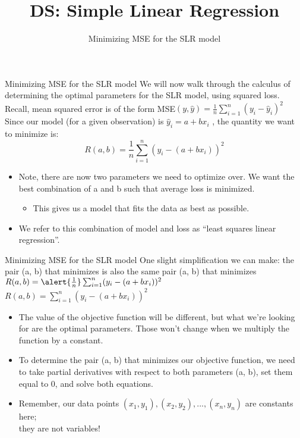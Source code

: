 \documentclass[aspectratio=169]{../latex_main/tntbeamer}  %
\title[Regression]{DS: Simple Linear Regression}
\subtitle{Minimizing MSE for the SLR model}
\begin{document}
	
	\maketitle
	\begin{frame}{Minimizing MSE for the SLR model}
	    We will now walk through the calculus of determining the optimal parameters for the SLR model, using squared loss. Recall, mean squared error is of the form    MSE$(y,\hat{y})= \frac{1}{n}\sum_{i=1}^n(y_i-\hat{y}_i)^2$             
	   Since our model (for a given observation) is  $\hat{y}_i = a +bx_i$                        , the quantity we want to minimize is: 
	   \begin{equation*}
	       R(a,b)= \frac{1}{n}\sum_{i=1}^n(y_i- (a +bx_i))^2
	   \end{equation*}
        \begin{itemize}
            \item Note, there are now two parameters we need to optimize over. We want the best combination of a and b such that average loss is minimized.
            \begin{itemize}
                \item This gives us a model that fits the data as best as possible.
            \end{itemize}
            \item We refer to this combination of model and loss as \alert{``least squares linear regression''}.
    
        \end{itemize}
	\end{frame}
	
	
	\begin{frame}{Minimizing MSE for the SLR model}
	    One slight simplification we can make: the pair (a, b) that minimizes is also the same pair (a, b) that minimizes      $R(a,b)= \alert{\frac{1}{n}}\sum_{i=1}^n(y_i- (a +bx_i))^2$    \\         
	     \hspace{5cm} $ R(a,b)= \sum_{i=1}^n(y_i- (a +bx_i))^2$
        \begin{itemize}
            \item The value of the objective function will be different, but what we’re looking for are the optimal parameters. Those won’t change when we multiply the function by a constant.
            \item To determine the pair (a, b) that minimizes our objective function, we need to take partial derivatives with respect to both parameters (a, b), set them equal to 0, and solve both equations. 
            \item Remember, our data points ${(x_1, y_1),(x_2,y_2),...,(x_n,y_n)} $ are constants here;\\ they are not variables!
        \end{itemize}
	\end{frame}
	
\end{document}
